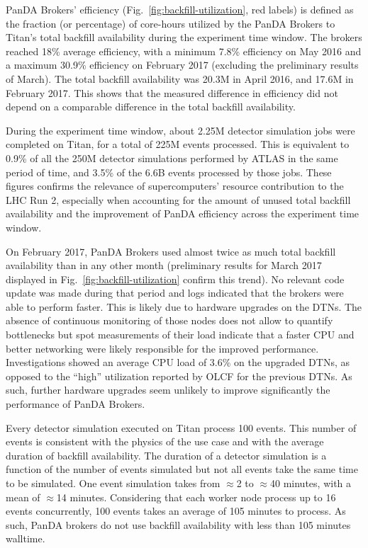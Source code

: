 PanDA Brokers' efficiency (Fig.~\ref{fig:backfill-utilization}, red labels)
is defined as the fraction (or percentage) of core-hours utilized by the
PanDA Brokers to Titan’s total backfill availability during the experiment
time window. The brokers reached 18\% average efficiency, with a minimum
7.8\% efficiency on May 2016 and a maximum 30.9\% efficiency on February 2017
(excluding the preliminary results of March). The total backfill availability
was 20.3M in April 2016, and 17.6M in February 2017. This shows that the
measured difference in efficiency did not depend on a comparable difference
in the total backfill availability.

During the experiment time window, about 2.25M detector simulation jobs were
completed on Titan, for a total of 225M events processed. This is equivalent
to 0.9\% of all the 250M detector simulations performed by ATLAS in the same
period of time, and 3.5\% of the 6.6B events processed by those jobs. These
figures confirms the relevance of supercomputers' resource contribution to
the LHC Run 2, especially when accounting for the amount of unused total
backfill availability and the improvement of PanDA efficiency across the
experiment time window.

On February 2017, PanDA Brokers used almost twice as much total backfill
availability than in any other month (preliminary results for March 2017
displayed in Fig.~\ref{fig:backfill-utilization} confirm this trend). No
relevant code update was made during that period and logs indicated that the
brokers were able to perform faster. This is likely due to hardware upgrades
on the DTNs. The absence of continuous monitoring of those nodes does not
allow to quantify bottlenecks but spot measurements of their load indicate
that a faster CPU and better networking were likely responsible for the
improved performance. Investigations showed an average CPU load of 3.6\% on
the upgraded DTNs, as opposed to the ``high'' utilization reported by OLCF
for the previous DTNs. As such, further hardware upgrades seem unlikely to
improve significantly the performance of PanDA Brokers.

Every detector simulation executed on Titan process 100 events. This number
of events is consistent with the physics of the use case and with the average
duration of backfill availability. The duration of a detector simulation is a
function of the number of events simulated but not all events take the same
time to be simulated. One event simulation takes from $\approx$2 to
$\approx$40 minutes, with a mean of $\approx$14 minutes. Considering that
each worker node process up to 16 events concurrently, 100 events takes an
average of 105 minutes to process. As such, PanDA brokers do not use backfill
availability with less than 105 minutes walltime.

